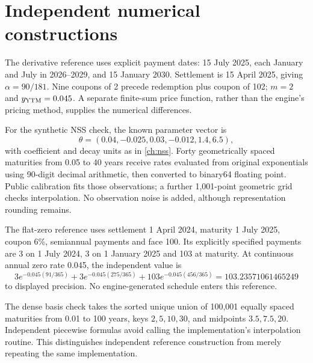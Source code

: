 \section{Independent numerical constructions}\label{sec:app-reference-inputs}
The derivative reference uses explicit payment dates: 15 July 2025, each January and July in 2026--2029, and 15 January 2030. Settlement is 15 April 2025, giving \(\alpha=90/181\). Nine coupons of 2 precede redemption plus coupon of 102; \(m=2\) and \(y_{\mathrm{YTM}}=0.045\). A separate finite-sum price function, rather than the engine's pricing method, supplies the numerical differences.

For the synthetic NSS check, the known parameter vector is
\[\theta=(0.04,-0.025,0.03,-0.012,1.4,6.5),\]
with coefficient and decay units as in \cref{ch:nss}. Forty geometrically spaced maturities from 0.05 to 40 years receive rates evaluated from original exponentials using 90-digit decimal arithmetic, then converted to binary64 floating point. Public calibration fits those observations; a further 1,001-point geometric grid checks interpolation. No observation noise is added, although representation rounding remains.

The flat-zero reference uses settlement 1 April 2024, maturity 1 July 2025, coupon 6\%, semiannual payments and face 100. Its explicitly specified payments are 3 on 1 July 2024, 3 on 1 January 2025 and 103 at maturity. At continuous annual zero rate 0.045, the independent value is
\[
3e^{-0.045(91/365)}+3e^{-0.045(275/365)}
 +103e^{-0.045(456/365)}=103.23571061465249
\]
to displayed precision. No engine-generated schedule enters this reference.

The dense basis check takes the sorted unique union of 100,001 equally spaced maturities from 0.01 to 100 years, keys \(2,5,10,30\), and midpoints \(3.5,7.5,20\). Independent piecewise formulas avoid calling the implementation's interpolation routine. This distinguishes independent reference construction from merely repeating the same implementation.
